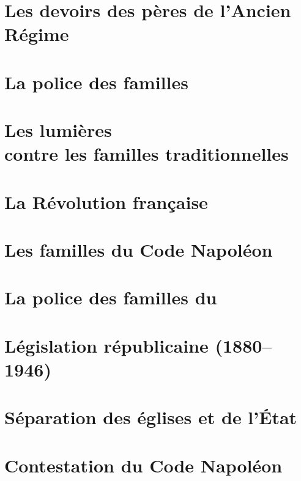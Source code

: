 \documentclass[12pt,french]{book}
\makeatletter
\newcommand*{\my@test@it}{it}
\newcommand*{\crm}[1]{%
\ifx\f@shape\my@test@it%
  \textsc{\textsl{\romannumeral #1}}\relax
\else%
  \textsc{\romannumeral #1}\relax
\fi}
\newcommand*{\crmieme}[1]{%
\crm{#1}%
\ifnum#1=1%
  \ifdefined\ier%
    \ier%
  \else%
    \textsuperscript{\lowercase{er}}%
  \fi%
\else%
  \ifdefined\ieme%
    \ieme%
  \else%
    \textsuperscript{\lowercase{e}}%
  \fi%
\fi%
}
\newcommand*{\siecle}[1]{%
\crmieme{#1}\ siècle%
}
\makeatother
\begin{document}
\chapter{Les devoirs des pères de l'Ancien Régime}


\chapter{La police des familles}


\chapter[Les lumières contre les familles traditionnelles]{Les lumières\\contre les familles traditionnelles}


\chapter{La Révolution française}


\chapter{Les familles du Code Napoléon}


\chapter{La police des familles du }%


\chapter{Législation républicaine (1880--1946)}


\chapter{Séparation des églises et de l'État}


\chapter{Contestation du Code Napoléon}

\end{document}
